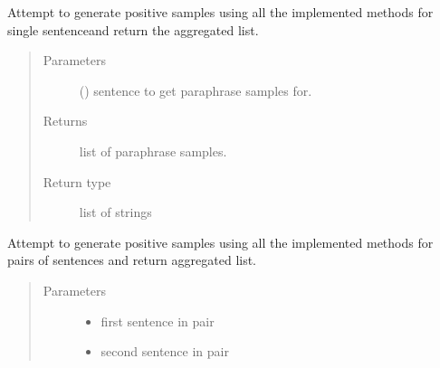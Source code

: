 \documentclass[letterpaper,10pt,english]{sphinxmanual}
\begin{document}
\begin{fulllineitems}
\begin{fulllineitems}
\label{\detokenize{ParaphraseDatasetCreation.Malayalam:ParaphraseDatasetCreation.Malayalam.Positive.PositiveParaphrases.generate}}
Attempt to generate positive samples using all the implemented methods
for single sentenceand return the aggregated list.
\begin{quote}\begin{description}
\item[{Parameters}] \leavevmode
{} () \textendash{} sentence to get paraphrase samples for.

\item[{Returns}] \leavevmode
list of paraphrase samples.

\item[{Return type}] \leavevmode
list of strings

\end{description}\end{quote}

\end{fulllineitems}


\begin{fulllineitems}
\label{\detokenize{ParaphraseDatasetCreation.Malayalam:ParaphraseDatasetCreation.Malayalam.Positive.PositiveParaphrases.generate_for_pair}}
Attempt to generate positive samples using all the implemented methods 
for pairs of sentences and return aggregated list.
\begin{quote}\begin{description}
\item[{Parameters}] \leavevmode\begin{itemize}
\item {} 
 \textendash{} first sentence in pair

\item {} 
 \textendash{} second sentence in pair


\end{itemize}
\end{description}
\end{quote}
\end{fulllineitems}
\end{fulllineitems}
\end{document}
